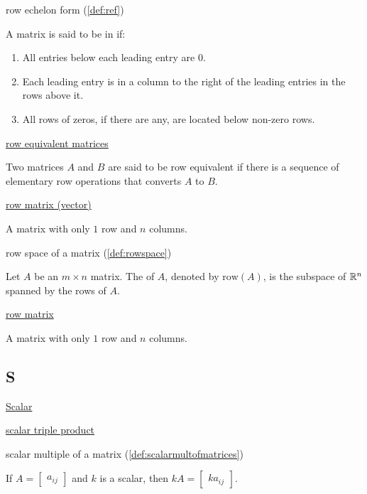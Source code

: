 \documentclass{ximera}
\begin{document}

row echelon form (\ref{def:ref})
\begin{expandable}
    A matrix is said to be in  if:
\begin{enumerate}
\item All entries below each leading entry are 0.
\item Each leading entry is in a column to the right of the leading entries in the rows above it.
\item All rows of zeros, if there are any, are located below non-zero rows.
\end{enumerate}
\end{expandable}

\href{https://ximera.osu.edu/oerlinalg/LinearAlgebra/SYS-0020/main}{row equivalent matrices}
\begin{expandable}
    Two matrices $A$ and $B$ are said to be row equivalent if there is a sequence of elementary row operations that converts $A$ to $B$.
\end{expandable}

\href{https://ximera.osu.edu/oerlinalg/LinearAlgebra/MAT-0010/main}{row matrix (vector)}
\begin{expandable}
    A matrix with only $1$ row and $n$ columns.
\end{expandable}

row space of a matrix (\ref{def:rowspace})
\begin{expandable}
    Let $A$ be an $m\times n$ matrix.  The  of $A$, denoted by $\mbox{row}(A)$, is the subspace of $\mathbb{R}^n$ spanned by the rows of $A$.
\end{expandable}


\href{https://ximera.osu.edu/oerlinalg/LinearAlgebra/MAT-0010/main}{row matrix}
\begin{expandable}
    A matrix with only $1$ row and $n$ columns.
\end{expandable}


\subsection{S}
\href{https://ximera.osu.edu/oerlinalg/LinearAlgebra/VEC-0010/main}{Scalar}

\href{https://ximera.osu.edu/oerlinalg/LinearAlgebra/DET-0070/main}{scalar triple product}

scalar multiple of a matrix
(\ref{def:scalarmultofmatrices})
\begin{expandable}
    If $A=\begin{bmatrix} a_{ij}\end{bmatrix} $ and $k$ is a scalar,
then $kA=\begin{bmatrix} ka_{ij}\end{bmatrix}$. 
\end{expandable}
\end{document}
